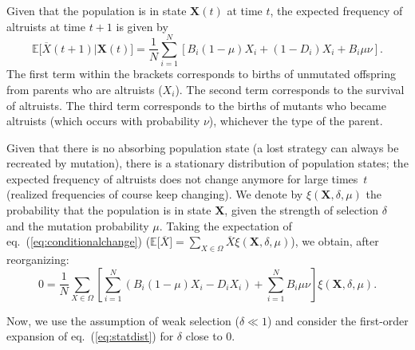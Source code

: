 \documentclass[11pt, letterpaper]{article}
\renewcommand{\eqref}[1]{\textup{{\normalfont eq.~(\ref{#1}}\normalfont)}}
\newcommand{\Esp}[1]{\mathbb{E}\big[ #1\big]}%
\newcommand{\mutbias}{\nu}
\newcommand{\selstr}{\delta}
\begin{document}
Given that the population is in state $\mathbf{X}(t)$ at time $t$, the expected frequency of altruists at time $t+1$ is given by
\begin{subequations}
\begin{equation}\label{eq:conditionalchange}
\Esp{\overline{X}(t+1) | \mathbf{X}(t)} = %
\frac{1}{N} \sum_{i=1}^N \left[ B_i (1-\mu) X_i + (1-D_i) X_i + B_i \mu \mutbias  \right]. 
\end{equation}
\end{subequations}
The first term within the brackets corresponds to births of unmutated offspring from parents who are altruists ($X_i$). The second term corresponds to the survival of altruists. The third term corresponds to the births of mutants who became altruists (which occurs with probability $\mutbias$), whichever the type of the parent. 

Given that there is no absorbing population state (a lost strategy can always be recreated by mutation), there is a stationary distribution of population states; the expected frequency of altruists does not change anymore for large times~$t$ (realized frequencies of course keep changing). We denote by $\xi(\mathbf{X}, \selstr, \mu)$ the probability that the population is in state $\mathbf{X}$, given the strength of selection $\selstr$ and the mutation probability $\mu$. Taking the expectation of \eqref{eq:conditionalchange} ($\Esp{\overline{X}} = \sum_{X \in \Omega} \overline{X}\xi(\mathbf{X}, \selstr, \mu)$), we obtain, after reorganizing:
\begin{equation}\label{eq:statdist}
0 = \frac{1}{N} \sum_{X\in \Omega} \left[ \sum_{i=1}^N \left( B_i (1-\mu) X_i - D_i X_i \right) + \sum_{i=1}^N B_i \mu \mutbias \right] \xi(\mathbf{X}, \selstr, \mu). 
\end{equation}

Now, we use the assumption of weak selection ($\selstr \ll 1$) and consider the first-order expansion of \eqref{eq:statdist} for $\selstr$ close to $0$. 
\end{document}
